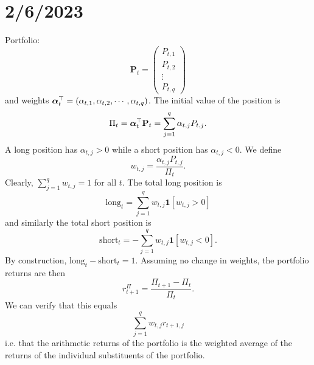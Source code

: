 \chapter{2/6/2023}
Portfolio: $$ \mathbf P_t=\begin{pmatrix} P_{t,1} \\ P_{t,2} \\ \vdots \\ P_{t,q} \end{pmatrix} $$ and weights $\boldsymbol{\alpha}_t^\top=(\alpha_{t,1},\alpha_{t,2},\cdots,\alpha_{t,q})$. The initial value of the position is $$ \Pi_t=\boldsymbol{\alpha}_t^\top \mathbf P_t=\sum_{j=1}^q \alpha_{t,j}P_{t,j}. $$ A long position has $\alpha_{t,j}>0$ while a short position has $\alpha_{t,j}<0$. We define $$ w_{t,j}=\frac{\alpha_{t,j}P_{t,j}}{\Pi_t}. $$ Clearly, $\sum_{j=1}^q w_{t,j}=1$ for all $t$. The total long position is $$ \text{long}_t = \sum_{j=1}^q w_{t,j}\mathbf 1[w_{t,j}>0] $$ and similarly the total short position is $$ \text{short}_t = -\sum_{j=1}^q w_{t,j}\mathbf 1[w_{t,j}<0]. $$ By construction, $\text{long}_t-\text{short}_t=1$. Assuming no change in weights, the portfolio returns are then $$ r_{t+1}^\Pi=\frac{\Pi_{t+1}-\Pi_t}{\Pi_t}. $$ We can verify that this equals $$ \sum_{j=1}^q w_{t,j} r_{t+1,j} $$ i.e. that the arithmetic returns of the portfolio is the weighted average of the returns of the individual substituents of the portfolio.

